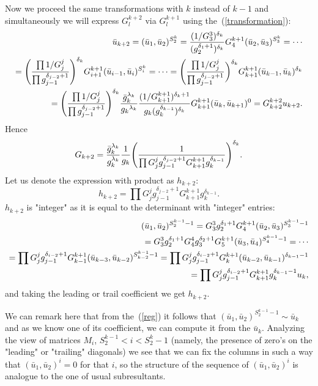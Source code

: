 \documentclass[12pt,fullpage]{article}
\begin{document}
Now we proceed the same transformations with $k$ instead of $k-1$ and simultaneously
we will express $G_l^{k+2}$ via $G_l^{k+1}$ using the~(\ref{transformation}):
\begin{eqnarray}
\bar u_{k+2}=(\bar u_1,\bar u_2)^{S_2^k}=
{{(1/G_3^3)^{\delta_k}}\over{(g_2^{\delta_1+1})^{\delta_k}}}G_4^{k+1}(\bar u_2,\bar u_3)^{S_3^k}=\cdots\cr
={\Biggl({{\prod{1/G_j^j}}\over{\prod{g_{j-1}^{\delta_{j-2}+1}}}}\Biggr)^{\delta_k}}G_{i+1}^{k+1}(\bar u_{i-1},\bar u_i)^{S_i^k}=\cdots
={\Biggl({{\prod{1/G_j^j}}\over{\prod{g_{j-1}^{\delta_{j-2}+1}}}}\biggr)^{\delta_k}}G_{k+1}^{k+1}(\bar u_{k-1},\bar u_k)^{\delta_k}\cr
{=\Biggl({{\prod{1/G_j^j}}\over{\prod{g_{j-1}^{\delta_{j-2}+1}}}}\Biggr)^{\delta_k}}
{{{\bar g}_k}^{\lambda_k}\over{{g_k}^{\lambda_k}}}
{{(1/G_{k+1}^{k+1})^{\delta_k+1}}\over{g_k(g_k^{\delta_{k-1}})^{\delta_k}}}G_{k+1}^{k+1}
(\bar u_k,\bar u_{k+1})^0=G_{k+2}^{k+2}u_{k+2}.\nonumber
\end{eqnarray}
Hence
$$
G_{k+2}={{\bar g}_k^{\lambda_k} \over {g_k^{\lambda_k}}}{1\over{g_k}}
\Biggl({1\over{\prod{G_j^jg_{j-1}^{\delta_{j-2}+1}}G_{k+1}^{k+1}g_k^{\delta_{k-1}}}}\Biggr)^
{\delta_k}.
$$
Let us denote the expression with product as $h_{k+2}$:
\begin{equation}
\label{h}
h_{k+2}={\prod{G_j^jg_{j-1}^{\delta_{j-2}+1}}G_{k+1}^{k+1}g_k^{\delta_{k-1}}}.
\end{equation}
$h_{k+2}$ is "integer" as it is equal to the determinant with "integer" 
entries:
\begin{eqnarray}
({\bar u}_1,{\bar u}_2)^{S_2^{k-1}-1}=G_3^3g_2^{\delta_1+1}G_4^{k+1}({\bar u}_2,{\bar u}_3)^{S_3^{k-1}-1}\cr\bigskip
=G_3^3g_2^{\delta_1+1}G_4^4g_3^{\delta_2+1}G_5^{k+1}({\bar u}_3,{\bar u}_4)^{S_4^{k-1}-1}=\cdots\cr\bigskip
=\prod{G_j^jg_{j-1}^{\delta_{i-2}+1}}G_{k-1}^{k+1}({\bar u}_{k-3},{\bar u}_{k-2})^{S_{k-2}^{k-1}-1}
=\prod{G_j^jg_{j-1}^{\delta_{i-2}+1}}G_k^{k+1}({\bar u}_{k-2},{\bar u}_{k-1})^{\delta_{k-1}-1}\cr
=\prod{G_j^jg_{j-1}^{\delta_{i-2}+1}}G_{k+1}^{k+1}g_k^{\delta_{k-1}-1}u_k,\label{reg}
\end{eqnarray}
and taking the leading or trail coefficient 
we get $h_{k+2}$.

We can remark here that from the~(\ref{reg}) it follows that 
$({\bar u}_1,{\bar u}_2)^{S_2^{k-1}-1}\sim {\bar u}_k$ and as we know one of its coefficient,
we can compute it from the ${\bar u}_k$.
Analyzing the view of matrices $M_i$, $S_2^{k-1}< i <S_2^k-1$ (namely, the presence
of zero's on the "leading" or "trailing" diagonals) we see that we can fix the columns in such a way
that $({\bar u}_1,{\bar u}_2)^i=0$ for that $i$, so the structure of the sequence of 
$({\bar u}_1,{\bar u}_2)^i$ is analogue to the one of usual subresultants.
\end{document}
